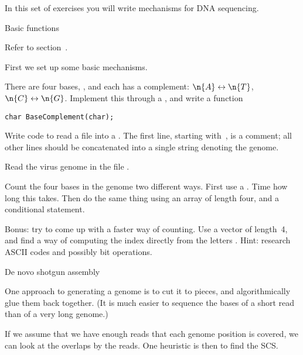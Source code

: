 
In this set of exercises you will write mechanisms for DNA sequencing.

 {Basic functions}

Refer to section~.

First we set up some basic mechanisms.

\begin{exercise}
  \label{ex:basecomp}
  There are four bases, , and each has a complement:
  $\n{A}\leftrightarrow\n{T}$, $\n{C}\leftrightarrow\n{G}$.
  Implement this through a , and write a function
\begin{verbatim}
char BaseComplement(char);
\end{verbatim}
\end{exercise}

\begin{exercise}
  \label{ex:basecount}
  Write code to
  read a  file into a .
  The first line, starting with~\n{>}, is a comment; all other lines
  should be concatenated into a single string denoting the genome.
  
  Read the virus genome in the file .

  Count the four bases in the genome two different ways.  First use a
  .  Time how long this takes. Then do the same thing using an
  array of length four, and a conditional statement.

  Bonus: try to come up with a faster way of counting. Use a vector of
  length~4, and find a way of computing the index directly from the
  letters . Hint: research ASCII codes and possibly bit operations.
\end{exercise}

 {De novo shotgun assembly}

One approach to generating a genome is to cut it to pieces,
and algorithmically glue them back together.
(It is much easier to sequence the bases of a short read
than of a very long genome.)

If we assume that we have enough reads that each
genome position is covered, we can look at
the overlaps by the reads.
One heuristic is then to find the \acf{SCS}.

